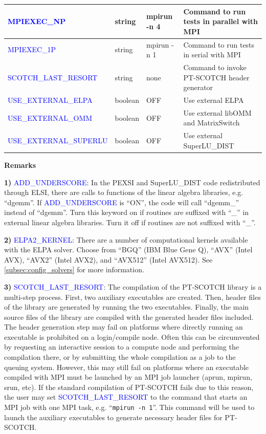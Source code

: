 \documentclass{report}
\begin{document}
\begin{tabular}[]{|p{50mm}|p{15mm}|p{20mm}|p{80mm}|}
\hline
\textcolor{blue}{MPIEXEC\_NP}                & string  & mpirun -n 4 & Command to run tests in parallel with MPI\\
\hline
\textcolor{blue}{MPIEXEC\_1P}                & string  & mpirun -n 1 & Command to run tests in serial with MPI\\
\hline
\textcolor{blue}{SCOTCH\_LAST\_RESORT}       & string  & none        & Command to invoke PT-SCOTCH header generator\\
\hline
\textcolor{blue}{USE\_EXTERNAL\_ELPA}        & boolean & OFF         & Use external ELPA\\
\hline
\textcolor{blue}{USE\_EXTERNAL\_OMM}         & boolean & OFF         & Use external libOMM and MatrixSwitch\\
\hline
\textcolor{blue}{USE\_EXTERNAL\_SUPERLU}     & boolean & OFF         & Use external SuperLU\_DIST\\
\hline
\end{tabular}

\textbf{Remarks}

\textbf{1)} \textcolor{blue}{ADD\_UNDERSCORE}:  In the PEXSI and SuperLU\_DIST code redistributed through ELSI, there are calls to functions of the linear algebra libraries, e.g. ``dgemm''.  If \textcolor{blue}{ADD\_UNDERSCORE} is ``ON'', the code will call ``dgemm\_'' instead of ``dgemm''.  Turn this keyword on if routines are suffixed with ``\_'' in external linear algebra libraries.  Turn it off if routines are not suffixed with ``\_''.

\textbf{2)} \textcolor{blue}{ELPA2\_KERNEL}:  There are a number of computational kernels available with the ELPA solver.  Choose from ``BGQ'' (IBM Blue Gene Q), ``AVX'' (Intel AVX), ``AVX2'' (Intel AVX2), and ``AVX512'' (Intel AVX512).  See \ref{subsec:config_solvers} for more information.

\textbf{3)} \textcolor{blue}{SCOTCH\_LAST\_RESORT}:  The compilation of the PT-SCOTCH library is a multi-step process.  First, two auxiliary executables are created.  Then, header files of the library are generated by running the two executables.  Finally, the main source files of the library are compiled with the generated header files included.  The header generation step may fail on platforms where directly running an executable is prohibited on a login/compile node.  Often this can be circumvented by requesting an interactive session to a compute node and performing the compilation there, or by submitting the whole compilation as a job to the queuing system.  However, this may still fail on platforms where an executable compiled with MPI must be launched by an MPI job launcher (aprun, mpirun, srun, etc).  If the standard compilation of PT-SCOTCH fails due to this reason, the user may set \textcolor{blue}{SCOTCH\_LAST\_RESORT} to the command that starts an MPI job with one MPI task, e.g. ``\verb+mpirun -n 1+''.  This command will be used to launch the auxiliary executables to generate necessary header files for PT-SCOTCH.
\end{document}
